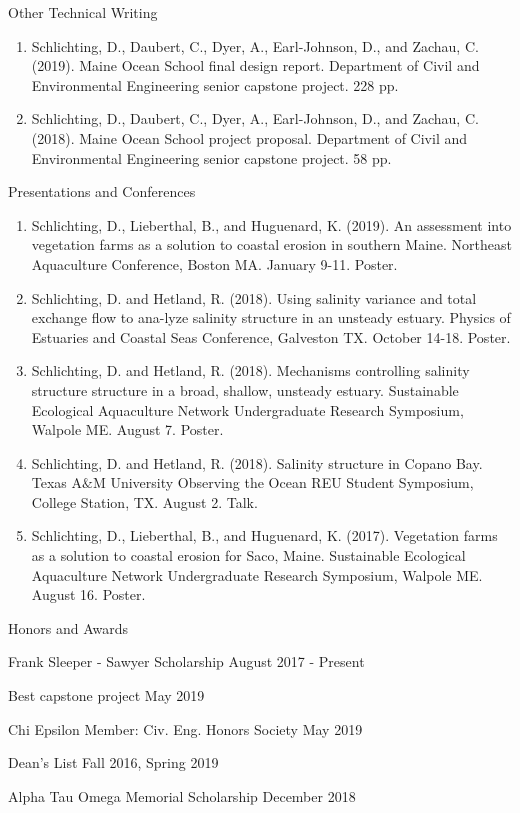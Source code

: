 \documentclass{resume} %
\begin{document}
\begin{rSection}{Other Technical Writing} \itemsep -3pt 
\begin{enumerate}
    \item  Schlichting, D., Daubert, C., Dyer, A., Earl-Johnson, D., and Zachau, C. (2019). Maine Ocean School final design report. Department of Civil and Environmental Engineering senior capstone project. 228 pp.
    \item  Schlichting, D., Daubert, C., Dyer, A., Earl-Johnson, D., and Zachau, C. (2018). Maine Ocean School project proposal. Department of Civil and Environmental Engineering senior capstone project. 58 pp.
\end{enumerate}
\end{rSection}

\begin{rSection}{Presentations and Conferences} \itemsep -3pt  
\begin{enumerate}
    \item Schlichting, D., Lieberthal, B., and Huguenard, K. (2019). An assessment into vegetation farms as a solution to coastal erosion in southern Maine. Northeast Aquaculture Conference, Boston MA. January 9-11. Poster.
    \item Schlichting, D. and Hetland, R. (2018). Using salinity variance and total exchange flow to ana-lyze salinity structure in an unsteady estuary. Physics of Estuaries and Coastal Seas Conference, Galveston TX. October 14-18. Poster.
    \item Schlichting, D. and Hetland, R. (2018). Mechanisms controlling salinity structure structure in a broad, shallow, unsteady estuary. Sustainable Ecological Aquaculture Network Undergraduate Research Symposium, Walpole ME. August 7. Poster.
    \item Schlichting, D. and Hetland, R. (2018). Salinity structure in Copano Bay. Texas A$\&$M University Observing the Ocean REU Student Symposium, College Station, TX. August 2. Talk.
    \item Schlichting, D., Lieberthal, B., and Huguenard, K. (2017). Vegetation farms as a solution to coastal erosion for Saco, Maine. Sustainable Ecological Aquaculture Network Undergraduate Research Symposium, Walpole ME. August 16. Poster.
\end{enumerate}
\end{rSection}
\begin{rSection}{Honors and Awards} \itemsep -3pt {}
\vspace{-7pt}
\item Frank Sleeper - Sawyer Scholarship \hfill August 2017 - Present
\item Best capstone project \hfill May 2019
\item Chi Epsilon Member: Civ. Eng. Honors Society \hfill May 2019 
\item Dean's List \hfill Fall 2016, Spring 2019
\item Alpha Tau Omega Memorial Scholarship \hfill December 2018
\end{rSection}
\end{document}
